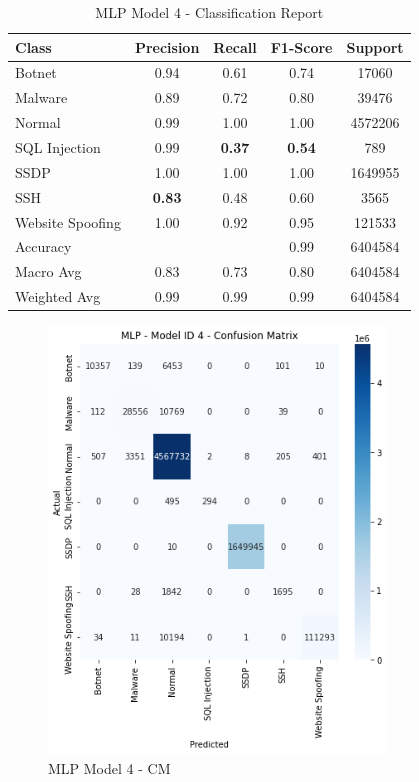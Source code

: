 \begin{table}[htbp]
  \centering
  \caption{MLP Model 4 - Classification Report}
  \label{tab:mlp_class_report}
    \begin{tabular}{lcccc}
    \toprule
    Class & Precision & Recall & F1-Score & Support \\
    \midrule
    Botnet & 0.94 & 0.61 & 0.74 & 17060 \\
    Malware & 0.89 & 0.72 & 0.80 & 39476 \\
    Normal & 0.99 & 1.00 & 1.00 & 4572206 \\
    SQL Injection & 0.99 & {\color{red}\bfseries 0.37} & {\color{red}\bfseries 0.54} & 789 \\
    SSDP & 1.00 & 1.00 & 1.00 & 1649955 \\
    SSH & {\color{red}\bfseries 0.83} & 0.48 & 0.60 & 3565 \\
    Website Spoofing & 1.00 & 0.92 & 0.95 & 121533 \\
    \midrule
    Accuracy & & & 0.99 & 6404584 \\
    Macro Avg & 0.83 & 0.73 & 0.80 & 6404584 \\
    Weighted Avg & 0.99 & 0.99 & 0.99 & 6404584 \\
    \bottomrule
    \end{tabular}
\end{table}

\begin{figure}[H]
    \centering
	\includegraphics[width=0.8\textwidth]{Appendices/Images/MLP/Model4/MLP_Model4_CM.png}
	\caption{MLP Model 4 - CM}
  	\label{fig:mlp_model4_cm}
\end{figure}



